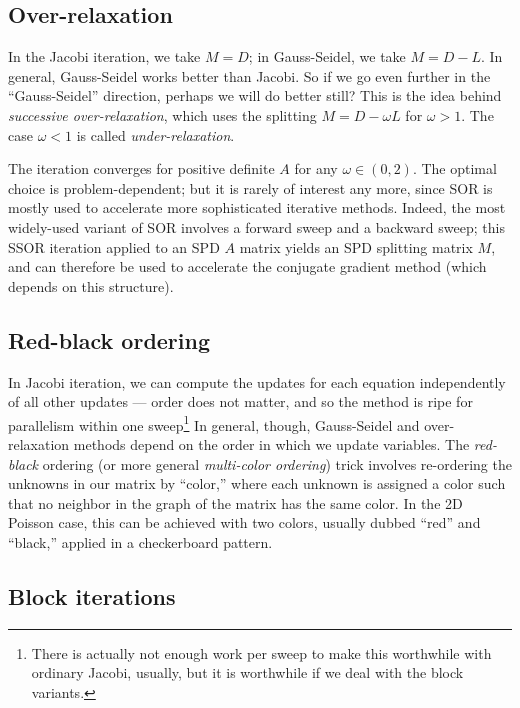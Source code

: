 


\subsection{Over-relaxation}

In the Jacobi iteration, we take $M = D$; in Gauss-Seidel, we take $M = D-L$.
In general, Gauss-Seidel works better than Jacobi.  So if we go even further
in the ``Gauss-Seidel'' direction, perhaps we will do better still?  This is
the idea behind {\em successive over-relaxation}, which uses the splitting
$M = D-\omega L$ for $\omega > 1$.  The case $\omega < 1$ is called
{\em under-relaxation}.

The iteration converges for positive definite $A$ for any $\omega \in (0,2)$.
The optimal choice is problem-dependent; but it is rarely of interest any
more, since SOR is mostly used to accelerate more sophisticated iterative
methods.  Indeed, the most widely-used variant of SOR involves a
forward sweep and a backward sweep; this SSOR iteration applied to an SPD $A$
matrix yields an SPD splitting matrix $M$, and can therefore be used to
accelerate the conjugate gradient method (which depends on this structure).

\subsection{Red-black ordering}

In Jacobi iteration, we can compute the updates for each equation
independently of all other updates --- order does not matter, and so the
method is ripe for parallelism within one sweep\footnote{%
  There is actually not enough work per sweep to make this worthwhile
  with ordinary Jacobi, usually, but it is worthwhile if we deal
  with the block variants.
}
In general, though, Gauss-Seidel and over-relaxation methods depend
on the order in which we update variables.  The {\em red-black} ordering
(or more general {\em multi-color ordering}) trick involves re-ordering
the unknowns in our matrix by ``color,'' where each unknown is assigned
a color such that no neighbor in the graph of the matrix has the same
color.  In the 2D Poisson case, this can be achieved with two colors,
usually dubbed ``red'' and ``black,'' applied in a checkerboard pattern.

\subsection{Block iterations}

